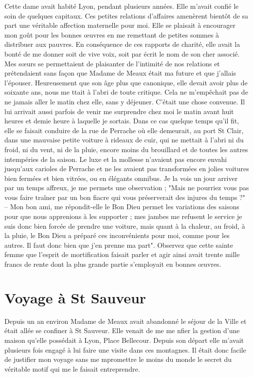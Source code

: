 \documentclass[11pt,a4paper]{report}
\begin{document}
Cette dame avait habité Lyon, pendant plusieurs années. Elle m'avait confié le soin de quelques capitaux. Ces petites relations d'affaires amenèrent bientôt de sa part une véritable affection maternelle pour moi. Elle se plaisait à encourager mon goût pour les bonnes œuvres en me remettant de petites sommes à distribuer aux pauvres. En conséquence de ces rapports de charité, elle avait la bonté de me donner soit de vive voix, soit par écrit le nom de son cher associé. Mes sœurs se permettaient de plaisanter de l'intimité de nos relations et prétendaient sans façon que Madame de Meaux était ma future et que j'allais l'épouser. Heureusement que son âge plus que canonique, elle devait avoir plus de soixante ans, nous me ttait à l'abri de toute critique. Cela ne m'empêchait pas de ne jamais aller le matin chez elle, sans y déjeuner. C'était une chose convenue. Il lui arrivait aussi parfois de venir me surprendre chez moi le matin avant huit heures et demie heure à laquelle je sortais. Dans ce cas quelque temps qu'il fit, elle se faisait conduire de la rue de Perrache où elle demeurait, au port St Clair, dans une mauvaise petite voiture à rideaux de cuir, qui ne mettait à l'abri ni du froid, ni du vent, ni de la pluie, encore moins du brouillard et de toutes les autres intempéries de la saison. Le luxe et la mollesse n'avaient pas encore envahi jusqu'aux carioles de Perrache et ne les avaient pas transformées en jolies voitures bien fermées et bien vitrées, ou en élégants omnibus. Je la vois un jour arriver par un temps affreux, je me permets une observation ; "Mais ne pourriez vous pas vous faire traîner par un bon fiacre qui vous préserverait des injures du temps ?" -- Mon bon ami, me répondit-elle le Bon Dieu permet les variations des saisons pour que nous apprenions à les supporter ; mes jambes me refusent le service je suis donc bien forcée de prendre une voiture, mais quant à la chaleur, au froid, à la pluie, le Bon Dieu a préparé ces inconvénients pour moi, comme pour les autres. Il faut donc bien que j'en prenne ma part". Observez que cette sainte femme que l'esprit de mortification faisait parler et agir ainsi avait trente mille francs de rente dont la plus grande partie s'employait en bonnes œuvres.

\section*{Voyage à St Sauveur}

Depuis un an environ Madame de Meaux avait abandonné le séjour de la Ville et était allée se confiner à St Sauveur. Elle venait de me me nfier la gestion d'une maison qu'elle possédait à Lyon, Place Bellecour. Depuis son départ elle m'avait plusieurs fois engagé à lui faire une visite dans ces montagnes. Il était donc facile de justifier mon voyage sans me mpromettre le moins du monde le secret du véritable motif qui me le faisait entreprendre.
\end{document}
